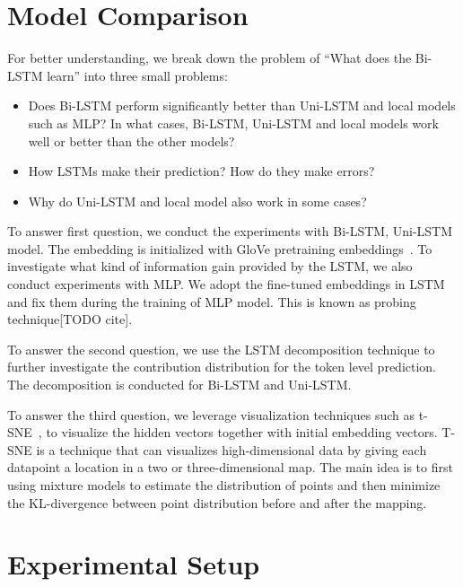 \documentclass{article}
\begin{document}
\section{Model Comparison}

For better understanding, we break down the problem of ``What does the Bi-LSTM learn'' into three small problems:

\begin{itemize}
	\item Does Bi-LSTM perform significantly better than Uni-LSTM and local models such as MLP? 
	In what cases, Bi-LSTM, Uni-LSTM and local models work well or better than the other models?
	\item How LSTMs make their prediction? How do they make errors? %
	\item Why do Uni-LSTM and local model also work in some cases? 
\end{itemize}

To answer first question, we conduct the experiments with Bi-LSTM, Uni-LSTM model. The embedding is initialized with GloVe pretraining embeddings~\cite{pennington2014glove}. To investigate what kind of information gain provided by the LSTM, we also conduct experiments with MLP. We adopt the fine-tuned embeddings in LSTM and fix them during the training of MLP model. This is known as probing technique[TODO cite]. 

To answer the second question, we use the LSTM decomposition technique to further investigate the contribution distribution for the token level prediction. The decomposition is conducted for Bi-LSTM and Uni-LSTM. 

To answer the third question, we leverage visualization techniques such as t-SNE~\cite{maaten2008visualizing}, to visualize the hidden vectors together with initial embedding vectors. T-SNE is a technique that can visualizes high-dimensional data by giving each datapoint a location in a two or three-dimensional map. The main idea is to first using mixture models to estimate the distribution of points and then minimize the KL-divergence between point distribution before and after the mapping.


\section{Experimental Setup}
\end{document}
